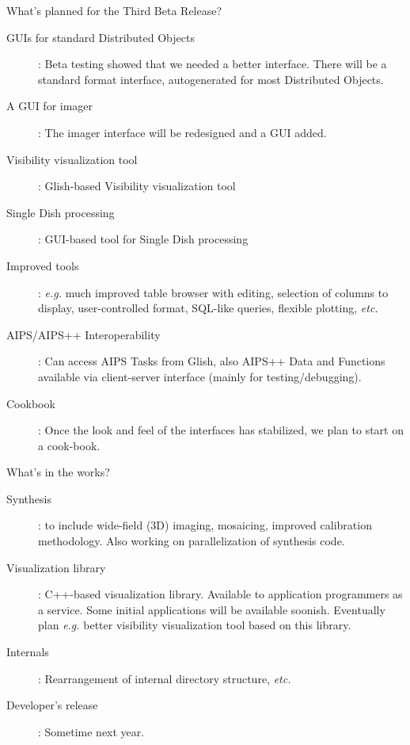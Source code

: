 \begin{slide}{What's planned for the Third Beta Release?}
\begin{description}
\item[GUIs for standard Distributed Objects]: Beta testing showed that
we needed a better interface. There will be a standard format interface,
autogenerated for most Distributed Objects.
\item[A GUI for imager]: The imager interface will be redesigned
and a GUI added.
\item[Visibility visualization tool]: Glish-based Visibility visualization
tool
\item[Single Dish processing]: GUI-based tool for Single Dish processing
\item[Improved tools]: {\em e.g.} much improved table browser with editing,
selection of columns to display, user-controlled format, SQL-like queries,
flexible plotting, {\em etc.}
\item[AIPS/AIPS++ Interoperability]: Can access AIPS Tasks from Glish,
also AIPS++ Data and Functions available via client-server interface
(mainly for testing/debugging).
\item[Cookbook]: Once the look and feel of the interfaces has stabilized,
we plan to start on a cook-book.
\end{description}
\end{slide}

\begin{slide}{What's in the works?}
\begin{description}
\item[Synthesis]: to include wide-field (3D) imaging, mosaicing, improved
calibration methodology. Also working on parallelization of synthesis code.
\item[Visualization library]: C++-based visualization library. Available
to application programmers as a service. Some initial applications will
be available soonish. Eventually plan {\em e.g.} better visibility
visualization tool based on this library.
\item[Internals]: Rearrangement of internal directory structure, {\em etc.}
\item[Developer's release]: Sometime next year.
\end{description}
\end{slide}

